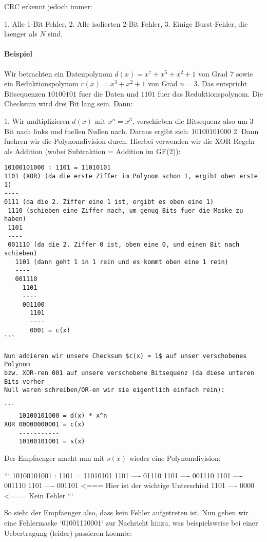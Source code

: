 CRC erkennt jedoch immer:

1. Alle 1-Bit Fehler,
2. Alle isolierten 2-Bit Fehler,
3. Einige Burst-Fehler, die laenger als $N$ sind.

\paragraph{Beispiel} 

Wir betrachten ein Datenpolynom $d(x) = x^7 + x^5 + x^2 + 1$ von Grad $7$ sowie
ein Reduktionspolynom $r(x) = x^3 + x^2 + 1$ von Grad $n = 3$. Das entspricht
Bitsequenzen $10100101$ fuer die Daten und $1101$ fuer das
Reduktionspolynom. Die Checksum wird drei Bit lang sein. Dann:

1. Wir multiplizieren $d(x)$ mit $x^n = x^3$, verschieben die Bitsequenz also um
   3 Bit nach links und fuellen Nullen nach. Daraus ergibt sich: $10100101000$
2. Dann fuehren wir die Polynomdivision durch. Hierbei verwenden wir die
   XOR-Regeln als Addition (wobei Subtraktion = Addition im GF(2)):

\begin{verbatim}
10100101000 : 1101 = 11010101
1101 (XOR) (da die erste Ziffer im Polynom schon 1, ergibt oben erste 1)
----
0111 (da die 2. Ziffer eine 1 ist, ergibt es oben eine 1)
 1110 (schieben eine Ziffer nach, um genug Bits fuer die Maske zu haben)
 1101
 ----
 001110 (da die 2. Ziffer 0 ist, oben eine 0, und einen Bit nach schieben)
   1101 (dann geht 1 in 1 rein und es kommt oben eine 1 rein)
   ----
   001110
     1101
	 ----
	 001100
	   1101
	   ----
	   0001 = c(x)
```

Nun addieren wir unsere Checksum $c(x) = 1$ auf unser verschobenes Polynom
bzw. XOR-ren 001 auf unsere verschobene Bitsequenz (da diese unteren Bits vorher
Null waren schreiben/OR-en wir sie eigentlich einfach rein):

```
    10100101000 = d(x) * x^n
XOR 00000000001 = c(x)
    -----------
    10100101001 = s(x)
\end{verbatim}

Der Empfaenger macht nun mit $s(x)$ wieder eine Polynomdivision:

```
10100101001 : 1101 = 11010101
1101
----
01110
 1101
 ----
 001110
   1101
   ----
   001110
     1101
	 ----
	 001101 <=== Hier ist der wichtige Unterschied
	   1101
	   ----
	   0000 <=== Kein Fehler
```

So sieht der Empfaenger also, dass kein Fehler aufgetreten ist. Nun geben wir
eine Fehlermaske `01001110001` zur Nachricht hinzu, was beispielsweise bei einer
Uebertragung (leider) passieren koennte:

